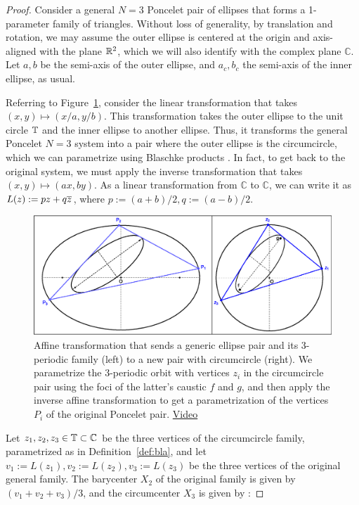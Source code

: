 \begin{proof}

Consider a general $N=3$ Poncelet pair of ellipses that forms a 1-parameter family of triangles. Without loss of generality, by translation and rotation, we may assume the outer ellipse is centered at the origin and axis-aligned with the plane $\mathbb{R}^2$, which we will also identify with the complex plane $\mathbb{C}$. Let $a,b$ be the semi-axis of the outer ellipse, and $a_c,b_c$ the semi-axis of the inner ellipse, as usual. 

Referring to Figure~\ref{fig:affine}, consider the linear transformation that takes $(x,y)\mapsto(x/a,y/b)$. This transformation takes the outer ellipse to the unit circle $\mathbb{T}$ and the inner ellipse to another ellipse. Thus, it transforms the general Poncelet $N=3$ system into a pair where the outer ellipse is the circumcircle, which we can parametrize using Blaschke products \cite{daepp-2019}. In fact, to get back to the original system, we must apply the inverse transformation that takes $(x,y)\mapsto(a x,b y)$. As a linear transformation from $\mathbb{C}$ to $\mathbb{C}$, we can write it as $L(z):=p z+q \overline{z}$, where $p:=(a+b)/2, q:=(a-b)/2$.

\begin{figure}
    \centering
    \includegraphics[width=\textwidth]{pics/0025_affine_circumcircle.eps}
    \caption{Affine transformation that sends a generic ellipse pair and its 3-periodic family (left) to a new pair with circumcircle (right). We parametrize the 3-periodic orbit with vertices $z_i$ in the circumcircle pair using the foci of the latter's caustic $f$ and $g$, and then apply the inverse affine transformation to get a parametrization of the vertices $P_i$ of the original Poncelet pair. \href{https://youtu.be/6xSFBLWIkTM}{Video}}
    \label{fig:affine}
\end{figure}


Let $z_1,z_2,z_3\in\mathbb{T}\subset\mathbb{C}$ be the three vertices of the circumcircle family, parametrized as in Definition~\ref{def:bla}, and let $v_1:=L(z_1),v_2:=L(z_2),v_3:=L(z_3)$ be the three vertices of the original general family. The barycenter $X_2$ of the original family is given by $(v_1+v_2+v_3)/3$, and the circumcenter $X_3$ is given by \cite{stackexchange-x3a}:


\end{proof}

